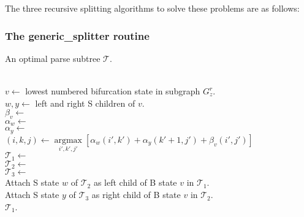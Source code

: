 \documentclass[11pt]{article}
\def\argmax{\mathop{\mathrm{argmax}}\limits}
\begin{document}
The three recursive splitting algorithms to solve these problems
are as follows:

\subsubsection{The generic\_splitter routine}
\begin{algorithm}
         {An optimal parse subtree $\mathcal{T}$.}

\begin{algtab*}
  \algreturn {}\\
\algelse
   $v   \leftarrow$ lowest numbered bifurcation state in subgraph $G^r_z$.\\
   $w,y \leftarrow$ left and right S children of $v$.\\
   $\beta_v \leftarrow$  \\
   $\alpha_w \leftarrow$ \\
   $\alpha_y \leftarrow$ \\

   $(i,k,j) \leftarrow \argmax_{i',k',j'} \left[ \alpha_w(i',k') +
   \alpha_y(k'+1,j') + \beta_v(i',j') \right] $ \\

   $\mathcal{T}_1   \leftarrow$ \\
   $\mathcal{T}_2 \leftarrow$ \\
   $\mathcal{T}_3 \leftarrow$ \\

   Attach S state $w$ of $\mathcal{T}_2$ as left child of B state $v$ in $\mathcal{T}_1$.\\
   Attach S state $y$ of $\mathcal{T}_3$ as right child of B state $v$ in $\mathcal{T}_2$.\\
  
   \algreturn $\mathcal{T}_1$.\\
\algend
\end{algtab*}
\end{algorithm}
\end{document}
